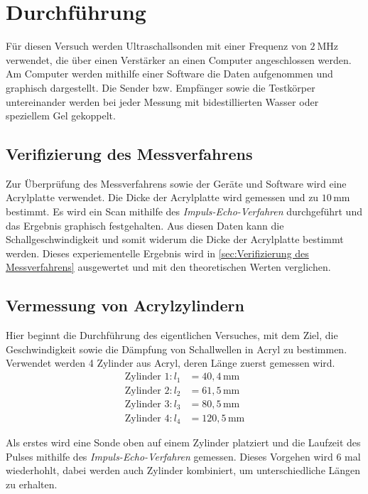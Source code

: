 \section{Durchführung}
\label{sec:Durchführung}
Für diesen Versuch werden Ultraschallsonden mit einer Frequenz von $\qty{2}{\mega\hertz}$ verwendet,
die über einen Verstärker an einen Computer angeschlossen werden.
Am Computer werden mithilfe einer Software die Daten aufgenommen und graphisch dargestellt.
Die Sender bzw. Empfänger sowie die Testkörper untereinander werden bei jeder Messung mit bidestillierten Wasser oder
speziellem Gel gekoppelt.

\subsection{Verifizierung des Messverfahrens}

Zur Überprüfung des Messverfahrens sowie der Geräte und Software wird eine Acrylplatte verwendet.
Die Dicke der Acrylplatte wird gemessen und zu $10\,\unit{\milli\metre}$ bestimmt.
Es wird ein Scan mithilfe des \textit{Impuls-Echo-Verfahren} durchgeführt und das Ergebnis graphisch festgehalten.
Aus diesen Daten kann die Schallgeschwindigkeit und somit widerum die Dicke der Acrylplatte bestimmt werden.
Dieses experiementelle Ergebnis wird in \ref{sec:Verifizierung des Messverfahrens} ausgewertet
und mit den theoretischen Werten verglichen.

\subsection{Vermessung von Acrylzylindern}

Hier beginnt die Durchführung des eigentlichen Versuches, mit dem Ziel, die Geschwindigkeit sowie die Dämpfung
von Schallwellen in Acryl zu bestimmen.
Verwendet werden 4 Zylinder aus Acryl, deren Länge zuerst gemessen wird.
\begin{align*}
    \text{Zylinder 1:}\,l_1&=40,4\,\unit{\milli\metre} \\
    \text{Zylinder 2:}\,l_2&=61,5\,\unit{\milli\metre} \\
    \text{Zylinder 3:}\,l_3&=80,5\,\unit{\milli\metre} \\
    \text{Zylinder 4:}\,l_4&=120,5\,\unit{\milli\metre}
\end{align*}

Als erstes wird eine Sonde oben auf einem Zylinder platziert und die Laufzeit des Pulses mithilfe des \textit{Impuls-Echo-Verfahren}
gemessen. Dieses Vorgehen wird 6 mal wiederhohlt, dabei werden auch Zylinder kombiniert, um unterschiedliche Längen zu erhalten.

